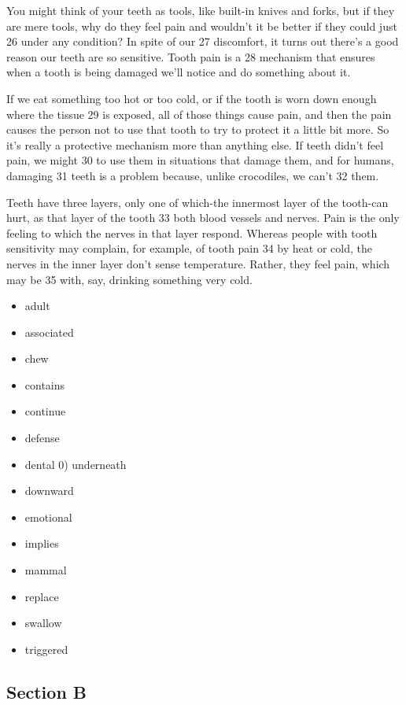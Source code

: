 \documentclass[UTF8,11pt]{ctexart}
\begin{document}
You might think of your teeth as tools, like built-in knives and forks, but if they are mere tools, why do they feel pain and wouldn't it be better if they could just 26 under any condition? In spite of our 27 discomfort, it turns out there's a good reason our teeth are so sensitive. Tooth pain is a 28 mechanism that ensures when a tooth is being damaged we'll notice and do something about it.


If we eat something too hot or too cold, or if the tooth is worn down enough where the tissue 29 is exposed, all of those things cause pain, and then the pain causes the person not to use that tooth to try to protect it a little bit more. So it's really a protective mechanism more than anything else. If teeth didn't feel pain, we might 30 to use them in situations that damage them, and for humans, damaging 31 teeth is a problem because, unlike crocodiles, we can't 32 them.


Teeth have three layers, only one of which-the innermost layer of the tooth-can hurt, as that layer of the tooth 33 both blood vessels and nerves. Pain is the only feeling to which the nerves in that layer respond. Whereas people with tooth sensitivity may complain, for example, of tooth pain 34 by heat or cold, the nerves in the inner layer don't sense temperature. Rather, they feel pain, which may be 35 with, say, drinking something very cold.


\begin{itemize}[leftmargin=2em,itemsep=.2em,topsep=.4em]\item[A.] adult
\item[B.] associated
\item[C.] chew
\item[D.] contains
\item[E.] continue
\item[F.] defense
\item[G.] dental 0) underneath
\item[H.] downward
\item[I.] emotional
\item[J.] implies
\item[K.] mammal
\item[L.] replace
\item[M.] swallow
\item[N.] triggered
\end{itemize}

\subsection*{\textbf{Section B}}
\end{document}
